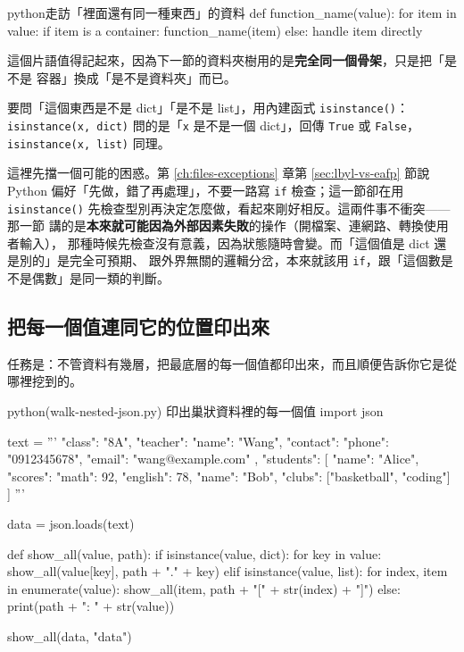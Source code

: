 \begin{code}{python}{走訪「裡面還有同一種東西」的資料}
def function_name(value):
    for item in value:
        if item is a container:
            function_name(item)
        else:
            handle item directly
\end{code}

這個片語值得記起來，因為下一節的資料夾樹用的是\textbf{完全同一個骨架}，只是把「是不是
容器」換成「是不是資料夾」而已。

要問「這個東西是不是 dict」「是不是 list」，用內建函式
\texttt{isinstance()}：\texttt{isinstance(x, dict)} 問的是「\texttt{x} 是不是一個
dict」，回傳 \texttt{True} 或 \texttt{False}，\texttt{isinstance(x, list)} 同理。

這裡先擋一個可能的困惑。第 \ref{ch:files-exceptions} 章第 \ref{sec:lbyl-vs-eafp} 節說
Python 偏好「先做，錯了再處理」，不要一路寫 \texttt{if} 檢查；這一節卻在用
\texttt{isinstance()} 先檢查型別再決定怎麼做，看起來剛好相反。這兩件事不衝突——那一節
講的是\textbf{本來就可能因為外部因素失敗}的操作（開檔案、連網路、轉換使用者輸入），
那種時候先檢查沒有意義，因為狀態隨時會變。而「這個值是 dict 還是別的」是完全可預期、
跟外界無關的邏輯分岔，本來就該用 \texttt{if}，跟「這個數是不是偶數」是同一類的判斷。

\subsection*{把每一個值連同它的位置印出來}

任務是：不管資料有幾層，把最底層的每一個值都印出來，而且順便告訴你它是從哪裡挖到的。

\begin{example}{python}{(walk-nested-json.py) 印出巢狀資料裡的每一個值}
import json

text = '''
{
    "class": "8A",
    "teacher": {
        "name": "Wang",
        "contact": {"phone": "0912345678", "email": "wang@example.com"}
    },
    "students": [
        {"name": "Alice", "scores": {"math": 92, "english": 78}},
        {"name": "Bob", "clubs": ["basketball", "coding"]}
    ]
}
'''

data = json.loads(text)


def show_all(value, path):
    if isinstance(value, dict):
        for key in value:
            show_all(value[key], path + "." + key)
    elif isinstance(value, list):
        for index, item in enumerate(value):
            show_all(item, path + "[" + str(index) + "]")
    else:
        print(path + ": " + str(value))


show_all(data, "data")
\end{example}

